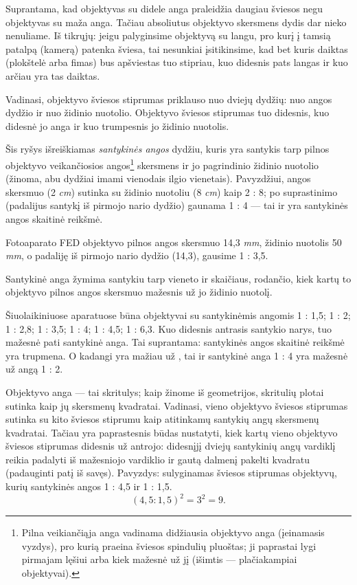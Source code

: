 \documentclass[12pt]{book}
\begin{document}
					Suprantama, kad objektyvas su didele anga praleidžia daugiau šviesos negu objektyvas su maža anga. Tačiau absoliutus objektyvo skersmens dydis dar nieko nenuliame. Iš tikrųjų: jeigu palyginsime objektyvą su langu, pro kurį į tamsią patalpą (kamerą) patenka šviesa, tai nesunkiai įsitikinsime, kad bet kuris daiktas (plokštelė arba fimas) bus apšviestas tuo stipriau, kuo didesnis pats langas ir kuo arčiau yra tas daiktas.

					Vadinasi, objektyvo šviesos stiprumas priklauso nuo dviejų dydžių: nuo angos dydžio ir nuo židinio nuotolio. Objektyvo šviesos stiprumas tuo didesnis, kuo didesnė jo anga ir kuo trumpesnis jo židinio nuotolis.

					Šis ryšys išreiškiamas \textit{santykinės angos} dydžiu, kuris yra santykis tarp pilnos objektyvo veikančiosios angos\footnote{Pilna veikiančiąja anga vadinama didžiausia objektyvo anga (įeinamasis vyzdys), pro kurią praeina šviesos spindulių pluoštas; ji paprastai lygi pirmajam lęšiui arba kiek mažesnė už jį (išimtis --- plačiakampiai objektyvai).} skersmens ir jo pagrindinio židinio nuotolio (žinoma, abu dydžiai imami vienodais ilgio vienetais). Pavyzdžiui, angos skersmuo (2 \textit{cm}) sutinka su židinio nuotoliu (8 \textit{cm}) kaip 2 : 8; po suprastinimo (padalijus santykį iš pirmojo nario dydžio) gaunama 1 : 4 --- tai ir yra santykinės angos skaitinė reikšmė.

					Fotoaparato FED objektyvo pilnos angos skersmuo 14,3 \textit{mm}, židinio nuotolis 50 \textit{mm}, o padaliję iš pirmojo nario dydžio (14,3), gausime 1 : 3,5.

					Santykinė anga žymima santykiu tarp vieneto ir skaičiaus, rodančio, kiek kartų to objektyvo pilnos angos skersmuo mažesnis už jo židinio nuotolį.

					Šiuolaikiniuose aparatuose būna objektyvai su santykinėmis angomis 1 : 1,5; 1 : 2; 1 : 2,8; 1 : 3,5; 1 : 4; 1 : 4,5; 1 : 6,3. Kuo didesnis antrasis santykio narys, tuo mažesnė pati santykinė anga. Tai suprantama: santykinės angos skaitinė reikšmė yra trupmena. O kadangi  yra mažiau už , tai ir santykinė anga 1 : 4 yra mažesnė už angą 1 : 2.

					Objektyvo anga --- tai skritulys; kaip žinome iš geometrijos, skritulių plotai sutinka kaip jų skersmenų kvadratai. Vadinasi, vieno objektyvo šviesos stiprumas sutinka su kito šviesos stiprumu kaip atitinkamų santykių angų skersmenų kvadratai. Tačiau yra paprastesnis būdas nustatyti, kiek kartų vieno objektyvo šviesos stiprumas didesnis už antrojo: didesnįjį dviejų santykinių angų vardiklį reikia padalyti iš mažesniojo vardiklio ir gautą dalmenį pakelti kvadratu (padauginti patį iš savęs). Pavyzdys: sulyginamas šviesos stiprumas objektyvų, kurių santykinės angos 1 : 4,5 ir 1 : 1,5.
					\[
						(4,5 : 1,5)^{2} = 3^{2} = 9.
					\]
\end{document}
